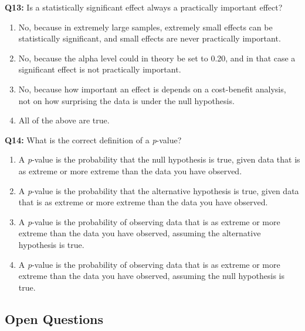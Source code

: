 \documentclass[
  oneside]{krantz}
\providecommand{\tightlist}{%
  \setlength{\itemsep}{0pt}\setlength{\parskip}{0pt}}
\begin{document}
\textbf{Q13:} Is a statistically significant effect always a practically important effect?

\begin{enumerate}
\def\labelenumi{\Alph{enumi})}
\tightlist
\item
  No, because in extremely large samples, extremely small effects can be statistically significant, and small effects are never practically important.
\item
  No, because the alpha level could in theory be set to 0.20, and in that case a significant effect is not practically important.
\item
  No, because how important an effect is depends on a cost-benefit analysis, not on how surprising the data is under the null hypothesis.
\item
  All of the above are true.
\end{enumerate}

\textbf{Q14:} What is the correct definition of a \emph{p}-value?

\begin{enumerate}
\def\labelenumi{\Alph{enumi})}
\tightlist
\item
  A \emph{p}-value is the probability that the null hypothesis is true, given data that is as extreme or more extreme than the data you have observed.
\item
  A \emph{p}-value is the probability that the alternative hypothesis is true, given data that is as extreme or more extreme than the data you have observed.
\item
  A \emph{p}-value is the probability of observing data that is as extreme or more extreme than the data you have observed, assuming the alternative hypothesis is true.
\item
  A \emph{p}-value is the probability of observing data that is as extreme or more extreme than the data you have observed, assuming the null hypothesis is true.
\end{enumerate}

\hypertarget{open-questions}{%
\subsection{Open Questions}\label{open-questions}}
\end{document}
